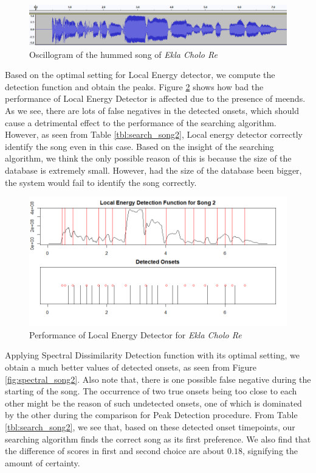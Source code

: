 \documentclass[10pt]{article}
\begin{document}
\begin{figure}
    \centering
    \includegraphics[width = \textwidth]{oscillogram_ekla_cholo_re.png}
    \caption{Oscillogram of the hummed song of \textit{Ekla Cholo Re}}
    \label{fig:oscillo_song2}
\end{figure}

Based on the optimal setting for Local Energy detector, we compute the detection function and obtain the peaks. Figure \ref{fig:energy_song2} shows how bad the performance of Local Energy Detector is affected due to the presence of meends. As we see, there are lots of false negatives in the detected onsets, which should cause a detrimental effect to the performance of the searching algorithm. However, as seen from Table \ref{tbl:search_song2}, Local energy detector correctly identify the song even in this case. Based on the insight of the searching algorithm, we think the only possible reason of this is because the size of the database is extremely small. However, had the size of the database been bigger, the system would fail to identify the song correctly.

\begin{figure}
    \centering
    \includegraphics[width = \textwidth]{energy_song2.png}
    \caption{Performance of Local Energy Detector for \textit{Ekla Cholo Re}}
    \label{fig:energy_song2}
\end{figure}

Applying Spectral Dissimilarity Detection function with its optimal setting, we obtain a much better values of detected onsets, as seen from Figure \ref{fig:spectral_song2}. Also note that, there is one possible false negative during the starting of the song. The occurrence of two true onsets being too close to each other might be the reason of such undetected onsets, one of which is dominated by the other during the comparison for Peak Detection procedure. From Table \ref{tbl:search_song2}, we see that, based on these detected onset timepoints, our searching algorithm finds the correct song as its first preference. We also find that the difference of scores in first and second choice are about $0.18$, signifying the amount of certainty.
\end{document}
